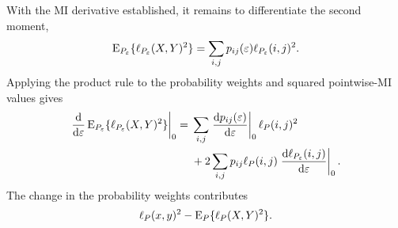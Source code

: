 With the MI derivative established, it remains to differentiate the second
moment,
\begin{equation}
  \operatorname{E}_{P_\varepsilon}\{\ell_{P_\varepsilon}(X,Y)^2\}
  =\sum_{i,j}p_{ij}(\varepsilon)
  \ell_{P_\varepsilon}(i,j)^2.
\end{equation}
Applying the product rule to the probability weights and squared
pointwise-MI values gives
\begin{align}
  \left.\frac{\mathrm d}{\mathrm d\varepsilon}
  \operatorname{E}_{P_\varepsilon}\{\ell_{P_\varepsilon}(X,Y)^2\}
  \right|_{0}
  ={}&
  \sum_{i,j}
  \left.\frac{\mathrm d p_{ij}(\varepsilon)}{\mathrm d\varepsilon}
  \right|_{0}
  \ell_P(i,j)^2
  \notag\\
  &+
  2\sum_{i,j}p_{ij}\ell_P(i,j)
  \left.\frac{\mathrm d\ell_{P_\varepsilon}(i,j)}
  {\mathrm d\varepsilon}\right|_{0}.
  \label{eq:m2-product-rule}
\end{align}
The change in the probability weights contributes
\begin{equation}
  \ell_P(x,y)^2-\operatorname{E}_P\{\ell_P(X,Y)^2\}.
  \label{eq:m2-weight-term}
\end{equation}

